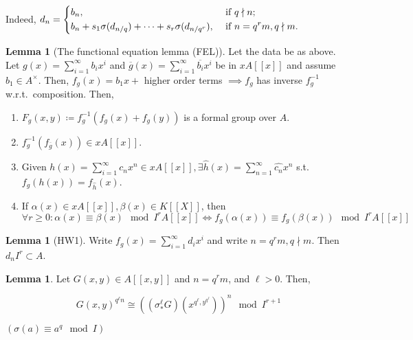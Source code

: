 \documentclass{article}
\theoremstyle{definition}
\numberwithin{theorem}{subsection}
\newtheorem{lemma}[theorem]{Lemma}
\begin{document}
    Indeed, \(d_n = \begin{dcases}
        b_n, &\text{ if } q\nmid n ;\\
        b_n + s_1 \sigma(d_{n / q}) + \cdots +s_r \sigma(d_{n / q^r}), &\text{ if } n = q^r m, q \nmid m.
    \end{dcases}\) 

    \begin{lemma}[The functional equation lemma (FEL)]

        Let the data be as above. Let \(g(x) = \sum_{i=1}^{\infty} b_i x^i\) and \(\overline{g}(x) = \sum_{i=1}^{\infty} \overline{b_i} x^i\) be in \(x A[[x]]\) and assume \(b_1 \in A^\times\). Then, \(f_g(x) = b_1 x +\) higher order terms \(\implies f_g\) has inverse \(f_g ^{-1}\) w.r.t.\ composition. Then,

        \begin{enumerate}[label=\roman*)]
            \item \(F_g(x,y) \coloneqq f_g ^{-1} (f_g(x) + f_g(y))\) is a formal group over \(A\).
            \item \(f_g ^{-1} (f_{\overline{g}}(x)) \in x A[[x]]\).
            \item Given \(h(x) = \sum_{i=1}^{\infty} c_n x^n \in x A[[x]], \exists \widehat{h} (x) = \sum_{n=1}^{\infty} \widehat{c_n} x^n\) s.t. \(f_g(h(x))=f_{\widehat{h}}(x)\).
            \item If \(\alpha(x) \in x A[[x]], \beta(x) \in K[[X]]\), then \(\forall r \geq 0: \alpha(x) \equiv \beta(x) \mod I^r A[[x]] \iff f_g(\alpha(x)) \equiv f_g(\beta (x)) \mod I^r A[[x]]\)   
        
        \end{enumerate} 

    \end{lemma}

    \begin{lemma}
        [HW1] Write \(f_g(x) = \sum_{i=1}^{\infty} d_i x^i\) and write \(n = q^r m, q \nmid m\). Then \(d_n I^r \subset A\).  
    \end{lemma}

    \begin{lemma}
        Let \(G(x,y) \in A[[x,y]]\) and \(n = q^r m\), and \(\ell > 0\). Then,
        
        \[
            G(x,y)^{q^\ell n} \cong \left( (\sigma_{\ast}^{\ell} G)(x^{q^{\ell}, y^{q^{\ell}}}) \right)^n \mod I^{r+1} 
        \]

        \((\sigma(a) \equiv a^q \mod I)\) 
    \end{lemma}
\end{document}
